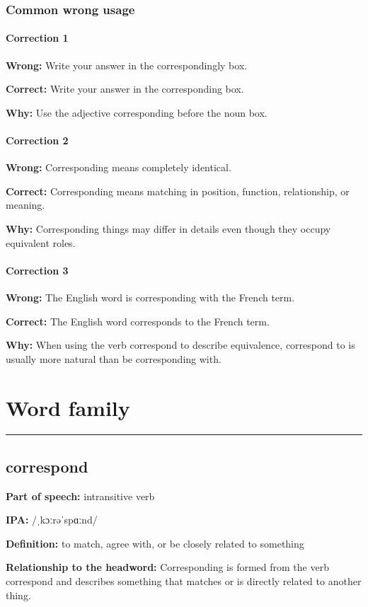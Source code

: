 \documentclass[11pt]{article}
\newcommand{\sectionrule}{\par\vspace{-0.5em}\noindent\textcolor{Accent}{\rule{\linewidth}{0.6pt}}\par}
\begin{document}
\subsubsection{Common wrong usage}
\paragraph{Correction 1}
\textbf{Wrong:} Write your answer in the correspondingly box.

\textbf{Correct:} Write your answer in the corresponding box.

\textbf{Why:} Use the adjective corresponding before the noun box.

\paragraph{Correction 2}
\textbf{Wrong:} Corresponding means completely identical.

\textbf{Correct:} Corresponding means matching in position, function, relationship, or meaning.

\textbf{Why:} Corresponding things may differ in details even though they occupy equivalent roles.

\paragraph{Correction 3}
\textbf{Wrong:} The English word is corresponding with the French term.

\textbf{Correct:} The English word corresponds to the French term.

\textbf{Why:} When using the verb correspond to describe equivalence, correspond to is usually more natural than be corresponding with.

\section{Word family}
\sectionrule
\subsection{correspond}
\textbf{Part of speech:} intransitive verb

\textbf{IPA:} /ˌkɔːrəˈspɑːnd/

\textbf{Definition:} to match, agree with, or be closely related to something

\textbf{Relationship to the headword:} Corresponding is formed from the verb correspond and describes something that matches or is directly related to another thing.
\end{document}
